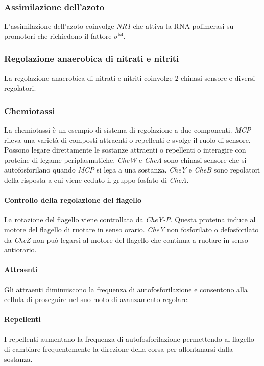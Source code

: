 		\subsubsection{Assimilazione dell'azoto}
		L'assimilazione dell'azoto coinvolge \emph{NR1} che attiva la RNA polimerasi su promotori che richiedono il fattore $\sigma^{54}$.

		\subsubsection{Regolazione anaerobica di nitrati e nitriti}
		La regolazione anaerobica di nitrati e nitriti coinvolge $2$ chinasi sensore e diversi regolatori.
			
		\subsubsection{Chemiotassi}
		La chemiotassi \`e un esempio di sistema di regolazione a due componenti.
		\emph{MCP} rileva una variet\`a di composti attraenti o repellenti e svolge il ruolo di sensore.
		Possono legare direttamente le sostanze attraenti o repellenti o interagire con proteine di legame periplasmatiche.
		\emph{CheW} e \emph{CheA} sono chinasi sensore che si autofosforilano quando \emph{MCP} si lega a una sostanza.
		\emph{CheY} e \emph{CheB} sono regolatori della risposta a cui viene ceduto il gruppo fosfato di \emph{CheA}.

			\paragraph{Controllo della regolazione del flagello}
			La rotazione del flagello viene controllata da \emph{CheY-P}.
			Questa proteina induce al motore del flagello di ruotare in senso orario.
			\emph{CheY} non fosforilato o defosforilato da \emph{CheZ} non pu\`o legarsi al motore del flagello che continua a ruotare in senso antiorario.

			\paragraph{Attraenti}
			Gli attraenti diminuiscono la frequenza di autofosforilazione e consentono alla cellula di proseguire nel suo moto di avanzamento regolare.

			\paragraph{Repellenti}
			I repellenti aumentano la frequenza di autofosforilazione permettendo al flagello di cambiare frequentemente la direzione della corsa per allontanarsi dalla sostanza.

